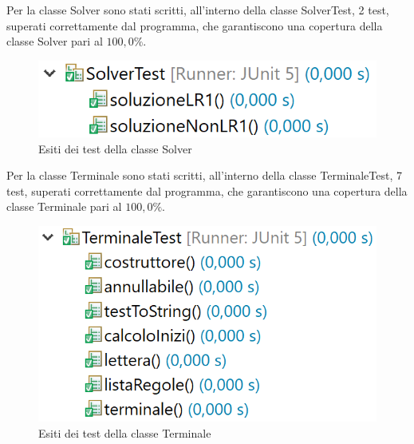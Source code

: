 \documentclass[12pt]{article}
\newcounter{subsubsubsection}[subsubsection]
\begin{document}
\pagebreak
{}
Per la classe Solver sono stati scritti, all'interno della classe SolverTest, 2 test, superati correttamente dal programma, che garantiscono una copertura della classe Solver pari al $100,0\%$.
\begin{figure}[h]
\centering
\includegraphics[scale=0.4]{immagini/esitiSolverTest.png}
\caption{Esiti dei test della classe Solver}
\end{figure}
Per la classe Terminale sono stati scritti, all'interno della classe TerminaleTest, 7 test, superati correttamente dal programma, che garantiscono una copertura della classe Terminale pari al $100,0\%$.
\begin{figure}[h]
\centering
\includegraphics[scale=0.4]{immagini/esitiTerminaleTest.png}
\caption{Esiti dei test della classe Terminale}
\end{figure}
\pagebreak
\end{document}
